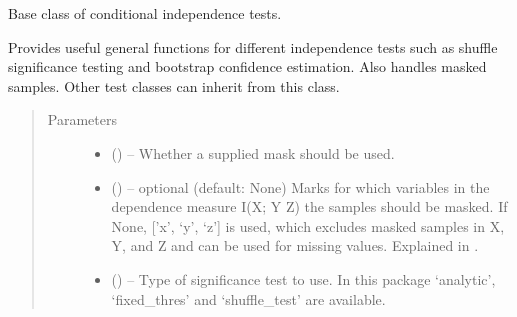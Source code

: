 \documentclass[letterpaper,10pt,english]{sphinxmanual}
\begin{document}
\begin{fulllineitems}
\label{\detokenize{index:tigramite.independence_tests.CondIndTest}}
Base class of conditional independence tests.

Provides useful general functions for different independence tests such as
shuffle significance testing and bootstrap confidence estimation. Also
handles masked samples. Other test classes can inherit from this class.
\begin{quote}\begin{description}
\item[{Parameters}] \leavevmode\begin{itemize}
\item {} 
 (\sphinxstyleliteralemphasis{, }\sphinxstyleliteralemphasis{ (}\sphinxstyleliteralemphasis{)}\sphinxstyleliteralemphasis{}) -- Whether a supplied mask should be used.

\item {} 
 (\sphinxstyleliteralemphasis{, }\sphinxstyleliteralemphasis{, }\sphinxstyleliteralemphasis{,}\sphinxstyleliteralemphasis{}) -- optional (default: None)
Marks for which variables in the dependence measure I(X; Y \textbar{} Z) the
samples should be masked. If None, {[}'x', `y', `z'{]} is used, which
excludes masked samples in X, Y, and Z and can be used for missing
values. Explained in \sphinxfootnotemark[1].

\item {} 
 (\sphinxstyleliteralemphasis{, }\sphinxstyleliteralemphasis{ (}\sphinxstyleliteralemphasis{)}\sphinxstyleliteralemphasis{}) -- Type of significance test to use. In this package `analytic',
`fixed\_thres' and `shuffle\_test' are available.


\end{itemize}
\end{description}
\end{quote}
\end{fulllineitems}
\end{document}
